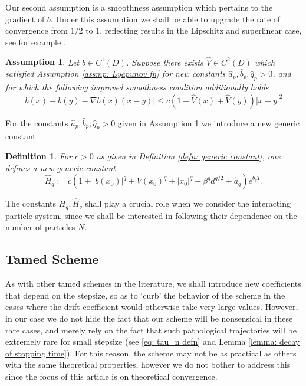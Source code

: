 \documentclass{article}
\newtheorem{defn}{Definition}
\newtheorem{assmp}{Assumption}
\begin{document}
Our second assumption is a smoothness assumption which pertains to the gradient of $b$. Under this assumption we shall be able to upgrade the rate of convergence from $1/2$ to $1$, reflecting results in the Lipschitz and superlinear case, see for example \cite{articletamed}.
\begin{assmp}\label{assmp: Lyapunov controls nabla b}
Let $b\in C^1(D)$. Suppose there exists $\hat{V}\in C^2(D)$ which satisfied Assumption \ref{assmp: Lyapunov fn} for new constants $\hat{a}_p, \hat{b}_p, \hat{q}_p>0$, and for which the following improved smoothness condition additionally holds
\begin{equation}\label{eq: higher order Lyapunov}
  \lvert b(x)-b(y)- \nabla b(x)(x-y) \rvert \leq c (1+ \hat{V}(x)+ \hat{V}(y))\lvert x-y \rvert^2.
\end{equation} 
\end{assmp}
For the constants $\hat{a}_p, \hat{b}_p, \hat{q}_p>0$ given in Assumption \ref{assmp: Lyapunov controls nabla b} we introduce a new generic constant
\begin{defn}\label{defn: generic constant 2}
    For $c>0$ as given in Definition \ref{defn: generic constant}, one defines a new generic constant
       \begin{equation}\label{eq: H_p hat defn}
    \hat{H}_q:=c(1+\lvert b(x_0)\rvert^q+V(x_0)^q+\lvert x_0\rvert^q+\beta^{q}d^{q/2} +\hat{a}_q)e^{\hat{b}_q T}.
\end{equation}
\end{defn}
The constants $H_q, \hat{H}_q$ shall play a crucial role when we consider the interacting particle system, since we shall be interested in following their dependence on the number of particles $N$.
\subsection{Tamed Scheme}
As with other tamed schemes in the literature, we shall introduce new coefficients that depend on the stepsize, so as to `curb' the behavior of the scheme in the cases where the drift coefficient would otherwise take very large values. However, in our case we do not hide the fact that our scheme will be nonsensical in these rare cases, and merely rely on the fact that such pathological trajectories will be extremely rare for small stepsize (see \eqref{eq: tau_n defn} and Lemma \ref{lemma: decay of stopping time}). For this reason, the scheme may not be as practical as others with the same theoretical properties, however we do not bother to address this since the focus of this article is on theoretical convergence.
\end{document}

